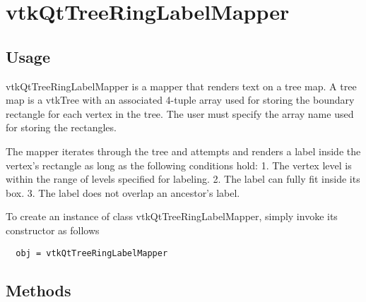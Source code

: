 \section{vtkQtTreeRingLabelMapper}

\subsection{Usage}

 vtkQtTreeRingLabelMapper is a mapper that renders text on a tree map.
 A tree map is a vtkTree with an associated 4-tuple array
 used for storing the boundary rectangle for each vertex in the tree.
 The user must specify the array name used for storing the rectangles.

 The mapper iterates through the tree and attempts and renders a label
 inside the vertex's rectangle as long as the following conditions hold:
 1. The vertex level is within the range of levels specified for labeling.
 2. The label can fully fit inside its box.
 3. The label does not overlap an ancestor's label.


To create an instance of class vtkQtTreeRingLabelMapper, simply
invoke its constructor as follows
\begin{verbatim}
  obj = vtkQtTreeRingLabelMapper
\end{verbatim}
\subsection{Methods}

